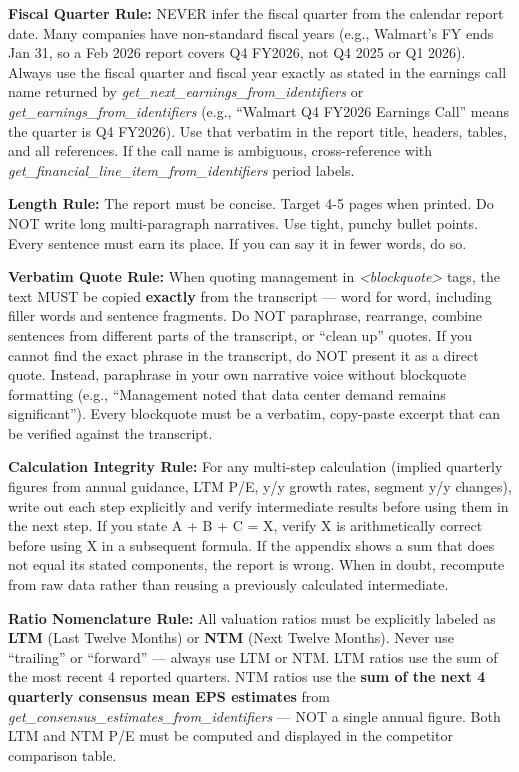\documentclass[11pt]{article}
\begin{document}
\textbf{Fiscal Quarter Rule:} NEVER infer the fiscal quarter from the calendar report date. Many companies have non-standard fiscal years (e.g., Walmart's FY ends Jan 31, so a Feb 2026 report covers Q4 FY2026, not Q4 2025 or Q1 2026). Always use the fiscal quarter and fiscal year exactly as stated in the earnings call name returned by \emph{get\_\allowbreak{}next\_\allowbreak{}earnings\_\allowbreak{}from\_\allowbreak{}identifiers} or \emph{get\_\allowbreak{}earnings\_\allowbreak{}from\_\allowbreak{}identifiers} (e.g., ``Walmart Q4 FY2026 Earnings Call'' means the quarter is Q4 FY2026). Use that verbatim in the report title, headers, tables, and all references. If the call name is ambiguous, cross-reference with \emph{get\_\allowbreak{}financial\_\allowbreak{}line\_\allowbreak{}item\_\allowbreak{}from\_\allowbreak{}identifiers} period labels.


\textbf{Length Rule:} The report must be concise. Target 4-5 pages when printed. Do NOT write long multi-paragraph narratives. Use tight, punchy bullet points. Every sentence must earn its place. If you can say it in fewer words, do so.


\textbf{Verbatim Quote Rule:} When quoting management in \emph{<blockquote>} tags, the text MUST be copied \textbf{exactly} from the transcript — word for word, including filler words and sentence fragments. Do NOT paraphrase, rearrange, combine sentences from different parts of the transcript, or ``clean up'' quotes. If you cannot find the exact phrase in the transcript, do NOT present it as a direct quote. Instead, paraphrase in your own narrative voice without blockquote formatting (e.g., ``Management noted that data center demand remains significant''). Every blockquote must be a verbatim, copy-paste excerpt that can be verified against the transcript.


\textbf{Calculation Integrity Rule:} For any multi-step calculation (implied quarterly figures from annual guidance, LTM P/E, y/y growth rates, segment y/y changes), write out each step explicitly and verify intermediate results before using them in the next step. If you state A + B + C = X, verify X is arithmetically correct before using X in a subsequent formula. If the appendix shows a sum that does not equal its stated components, the report is wrong. When in doubt, recompute from raw data rather than reusing a previously calculated intermediate.


\textbf{Ratio Nomenclature Rule:} All valuation ratios must be explicitly labeled as \textbf{LTM} (Last Twelve Months) or \textbf{NTM} (Next Twelve Months). Never use ``trailing'' or ``forward'' — always use LTM or NTM. LTM ratios use the sum of the most recent 4 reported quarters. NTM ratios use the \textbf{sum of the next 4 quarterly consensus mean EPS estimates} from \emph{get\_\allowbreak{}consensus\_\allowbreak{}estimates\_\allowbreak{}from\_\allowbreak{}identifiers} — NOT a single annual figure. Both LTM and NTM P/E must be computed and displayed in the competitor comparison table.
\end{document}
